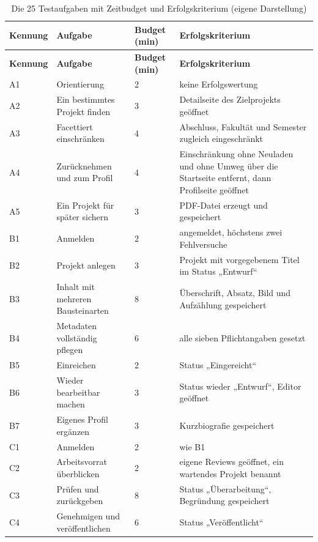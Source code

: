 \begingroup
\small
\setlength{\tabcolsep}{4pt}
\begin{longtable}{@{}L{1.4cm}L{4.3cm}L{1.5cm}L{6.6cm}@{}}
	\caption[Die 25 Testaufgaben mit Zeitbudget und Erfolgskriterium]{Die 25 Testaufgaben mit Zeitbudget und Erfolgskriterium (eigene Darstellung)}
	\label{tab:testaufgaben}\\
	\toprule
	\textbf{Kennung} & \textbf{Aufgabe} & \textbf{Budget (min)} & \textbf{Erfolgskriterium} \\
	\midrule
	\endfirsthead
	\toprule
	\textbf{Kennung} & \textbf{Aufgabe} & \textbf{Budget (min)} & \textbf{Erfolgskriterium} \\
	\midrule
	\endhead
	\bottomrule
	\endfoot
	A1 & Orientierung & 2 & keine Erfolgswertung \\
	A2 & Ein bestimmtes Projekt finden & 3 & Detailseite des Zielprojekts geöffnet \\
	A3 & Facettiert einschränken & 4 & Abschluss, Fakultät und Semester zugleich eingeschränkt \\
	A4 & Zurücknehmen und zum Profil & 4 & Einschränkung ohne Neuladen und ohne Umweg über die Startseite entfernt, dann Profilseite geöffnet \\
	A5 & Ein Projekt für später sichern & 3 & PDF-Datei erzeugt und gespeichert \\
	B1 & Anmelden & 2 & angemeldet, höchstens zwei Fehlversuche \\
	B2 & Projekt anlegen & 3 & Projekt mit vorgegebenem Titel im Status „Entwurf“ \\
	B3 & Inhalt mit mehreren Bausteinarten & 8 & Überschrift, Absatz, Bild und Aufzählung gespeichert \\
	B4 & Metadaten vollständig pflegen & 6 & alle sieben Pflichtangaben gesetzt \\
	B5 & Einreichen & 2 & Status „Eingereicht“ \\
	B6 & Wieder bearbeitbar machen & 3 & Status wieder „Entwurf“, Editor geöffnet \\
	B7 & Eigenes Profil ergänzen & 3 & Kurzbiografie gespeichert \\
	C1 & Anmelden & 2 & wie B1 \\
	C2 & Arbeitsvorrat überblicken & 2 & eigene Reviews geöffnet, ein wartendes Projekt benannt \\
	C3 & Prüfen und zurückgeben & 8 & Status „Überarbeitung“, Begründung gespeichert \\
	C4 & Genehmigen und veröffentlichen & 6 & Status „Veröffentlicht“ \\

\end{longtable}
